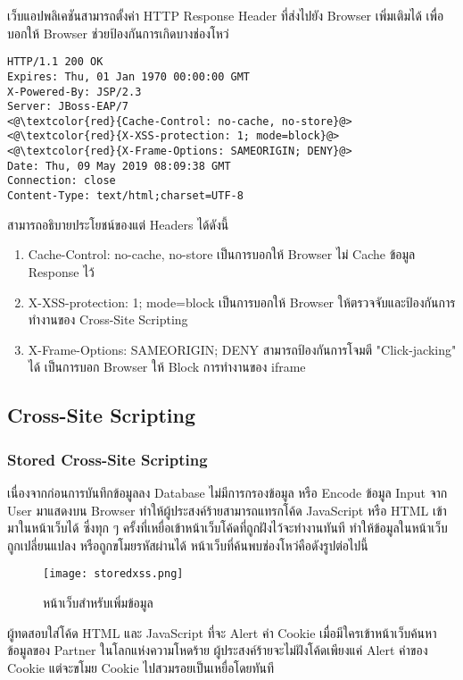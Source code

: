  เว็บแอปพลิเคชันสามารถตั้งค่า HTTP Response Header ที่ส่งไปยัง Browser เพิ่มเติมได้ เพื่อบอกให้ Browser ช่วยป้องกันการเกิดบางช่องโหว่
 
 \begin{lstlisting}[numbers=none] 
HTTP/1.1 200 OK
Expires: Thu, 01 Jan 1970 00:00:00 GMT
X-Powered-By: JSP/2.3
Server: JBoss-EAP/7
<@\textcolor{red}{Cache-Control: no-cache, no-store}@>
<@\textcolor{red}{X-XSS-protection: 1; mode=block}@> 
<@\textcolor{red}{X-Frame-Options: SAMEORIGIN; DENY}@> 
Date: Thu, 09 May 2019 08:09:38 GMT
Connection: close
Content-Type: text/html;charset=UTF-8
 \end{lstlisting}
 
สามารถอธิบายประโยชน์ของแต่ Headers ได้ดังนี้

\begin{enumerate}
	\item Cache-Control: no-cache, no-store เป็นการบอกให้ Browser ไม่ Cache ข้อมูล Response ไว้
	\item X-XSS-protection: 1; mode=block เป็นการบอกให้ Browser ให้ตรวจจับและป้องกันการทำงานของ Cross-Site Scripting
	\item X-Frame-Options: SAMEORIGIN; DENY สามารถป้องกันการโจมตี "Click-jacking" \cite{} ได้ เป็นการบอก Browser ให้ Block การทำงานของ iframe
\end{enumerate}

\subsection{Cross-Site Scripting}

\subsubsection{Stored Cross-Site Scripting}

เนื่องจากก่อนการบันทึกข้อมูลลง Database ไม่มีการกรองข้อมูล หรือ Encode ข้อมูล Input จาก User มาแสดงบน Browser ทำให้ผู้ประสงค์ร้ายสามารถแทรกโค้ด JavaScript หรือ HTML เข้ามาในหน้าเว็บได้ ซึ่งทุก ๆ ครั้งที่เหยื่อเข้าหน้าเว็บโค้ดที่ถูกฝังไว้จะทำงานทันที ทำให้ข้อมูลในหน้าเว็บถูกเปลี่ยนแปลง หรือถูกขโมยรหัสผ่านได้ หน้าเว็บที่ค้นพบช่องโหว่คือดังรูปต่อไปนี้

\begin{figure}[h]
	\centering
	\texttt{[image: storedxss.png]}
	\caption{หน้าเว็บสำหรับเพิ่มข้อมูล}
	\label{Fig:storedxss.png}
\end{figure}

ผู้ทดสอบใส่โค้ด HTML และ JavaScript ที่จะ Alert ค่า Cookie เมื่อมีใครเข้าหน้าเว็บค้นหาข้อมูลของ Partner ในโลกแห่งความโหดร้าย ผู้ประสงค์ร้ายจะไม่ฝังโค้ดเพียงแค่ Alert ค่าของ Cookie แต่จะขโมย Cookie ไปสวมรอยเป็นเหยื่อโดยทันที

